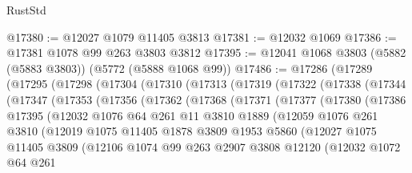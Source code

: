 \begin{lexlean}{RustStd}
\begin{coremodule}
{\begin{coremodule}
{{{{{{{{{{{{{{{{{{{{{{{{{{{{{@17380 := @12027 @1079 @11405 @3813
@17381 := @12032 @1069
@17386 := @17381 @1078 @99 @263 @3803 @3812
@17395 := @12041 @1068 @3803 (@5882 (@5883 @3803)) (@5772 (@5888 @1068 @99))
@17486 := @17286
    (@17289
      (@17295
        (@17298
          (@17304
            (@17310
              (@17313
                (@17319
                  (@17322
                    (@17338
                      (@17344
                        (@17347
                          (@17353
                            (@17356
                              (@17362
                                (@17368
                                  (@17371
                                    (@17377
                                      (@17380
                                        (@17386
                                          @17395
                                          (@12032
                                            @1076
                                            @64
                                            @261
                                            @11
                                            @3810
                                            @1889
                                            (@12059
                                              @1076
                                              @261
                                              @3810
                                              (@12019
                                                @1075
                                                @11405
                                                @1878
                                                @3809
                                                @1953
                                                @5860
                                                (@12027
                                                  @1075
                                                  @11405
                                                  @3809
                                                  (@12106
                                                    @1074
                                                    @99
                                                    @263
                                                    @2907
                                                    @3808
                                                    @12120
                                                    (@12032
                                                      @1072
                                                      @64
                                                      @261
}}}}}}}}}}}}}}}}}}}}}}}}}}}}}
\end{coremodule}}
\end{coremodule}
\end{lexlean}
